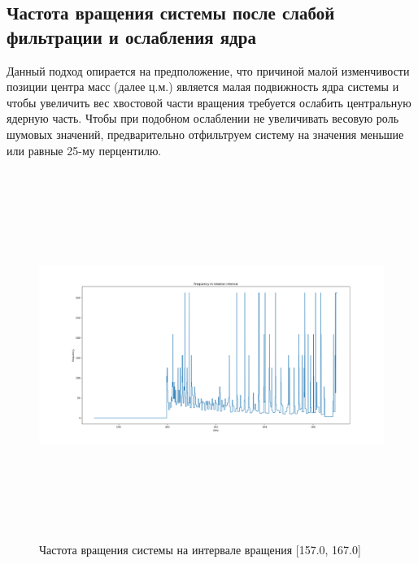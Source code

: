 \documentclass[a4paper,12pt]{article} %
\begin{document}
	\subsection{Частота вращения системы после слабой фильтрации и ослабления ядра}
	Данный подход опирается на предположение, что причиной малой изменчивости позиции центра масс (далее ц.м.) является малая подвижность ядра системы и чтобы увеличить вес хвостовой части вращения требуется ослабить центральную ядерную часть. Чтобы при подобном ослаблении не увеличивать весовую роль шумовых значений, предварительно отфильтруем систему на значения меньшие или равные 25-му перцентилю.
	\begin{figure}[H]
		\includegraphics[width = 18cm, height = 12cm]{Rot_dropped.png}
		\caption{Частота вращения системы на интервале вращения [157.0, 167.0]}
		\label{fig:rot_dropped}
	\end{figure}
\end{document}
